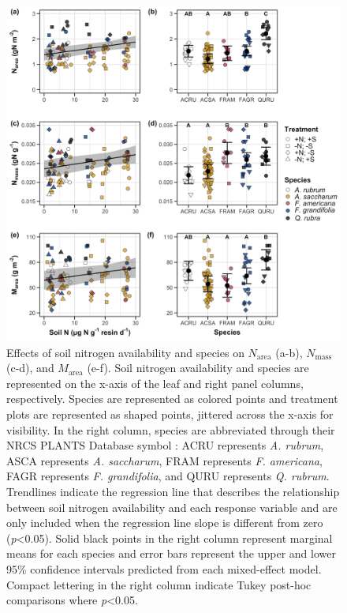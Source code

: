 \newpage
\begin{figure}
    \includegraphics[scale=0.15]{ch3_NxpH/figs/NxS_fig1_leafn.jpg}
    \centering
    \caption[Relationships between soil nitrogen availability and species on leaf nitrogen allocation]{Effects of soil nitrogen availability and species on $N_\mathrm{area}$ (a-b), $N_\mathrm{mass}$ (c-d), and $M_\mathrm{area}$ (e-f). Soil nitrogen availability and species are represented on the x-axis of the leaf and right panel columns, respectively. Species are represented as colored points and treatment plots are represented as shaped points, jittered across the x-axis for visibility. In the right column, species are abbreviated through their NRCS PLANTS Database symbol : ACRU represents \textit{A. rubrum}, ASCA represents \textit{A. saccharum}, FRAM represents \textit{F. americana}, FAGR represents \textit{F. grandifolia}, and QURU represents \textit{Q. rubrum}. Trendlines indicate the regression line that describes the relationship between soil nitrogen availability and each response variable and are only included when the regression line slope is different from zero (\textit{p}<0.05). Solid black points in the right column represent marginal means for each species and error bars represent the upper and lower 95\% confidence intervals predicted from each mixed-effect model. Compact lettering in the right column indicate Tukey post-hoc comparisons where \textit{p}<0.05.}
    \label{fig:figure3.1}
\end{figure}
\clearpage

